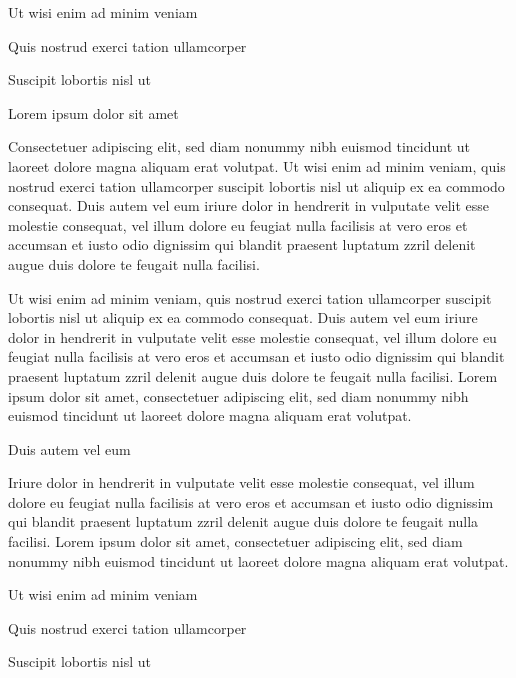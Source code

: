 \documentclass[11pt,twoside]{article}\makeatletter
\begin{document}
Ut wisi enim ad minim veniam\par
Quis nostrud exerci tation ullamcorper \par
Suscipit lobortis nisl ut \par
Lorem ipsum dolor sit amet\par
Consectetuer adipiscing elit, sed diam nonummy nibh euismod       tincidunt ut laoreet dolore magna aliquam erat volutpat. Ut wisi enim       ad minim veniam, quis nostrud exerci tation ullamcorper suscipit       lobortis nisl ut aliquip ex ea commodo consequat. Duis autem vel eum       iriure dolor in hendrerit in vulputate velit esse molestie consequat,       vel illum dolore eu feugiat nulla facilisis at vero eros et accumsan       et iusto odio dignissim qui blandit praesent luptatum zzril delenit       augue duis dolore te feugait nulla facilisi.\par
Ut wisi enim ad minim veniam, quis nostrud exerci tation       ullamcorper suscipit lobortis nisl ut aliquip ex ea commodo       consequat. Duis autem vel eum iriure dolor in hendrerit in vulputate       velit esse molestie consequat, vel illum dolore eu feugiat nulla       facilisis at vero eros et accumsan et iusto odio dignissim qui blandit       praesent luptatum zzril delenit augue duis dolore te feugait nulla       facilisi. Lorem ipsum dolor sit amet, consectetuer adipiscing elit,       sed diam nonummy nibh euismod tincidunt ut laoreet dolore magna       aliquam erat volutpat. \par
Duis autem vel eum \par
Iriure dolor in hendrerit in vulputate velit esse molestie       consequat, vel illum dolore eu feugiat nulla facilisis at vero eros et       accumsan et iusto odio dignissim qui blandit praesent luptatum zzril       delenit augue duis dolore te feugait nulla facilisi. Lorem ipsum dolor       sit amet, consectetuer adipiscing elit, sed diam nonummy nibh euismod       tincidunt ut laoreet dolore magna aliquam erat volutpat. \par
Ut wisi enim ad minim veniam\par
Quis nostrud exerci tation ullamcorper \par
Suscipit lobortis nisl ut 
\end{document}
